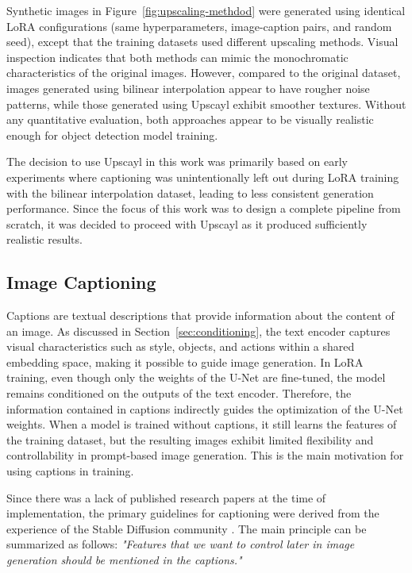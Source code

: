 Synthetic images in Figure~\ref{fig:upscaling-methdod} were generated using identical LoRA configurations (same hyperparameters, image-caption pairs, and random seed), except that the training datasets used different upscaling methods. Visual inspection indicates that both methods can mimic the monochromatic characteristics of the original images. However, compared to the original dataset, images generated using bilinear interpolation appear to have rougher noise patterns, while those generated using Upscayl exhibit smoother textures. Without any quantitative evaluation, both approaches appear to be visually realistic enough for object detection model training.

The decision to use Upscayl in this work was primarily based on early experiments where captioning was unintentionally left out during LoRA training with the bilinear interpolation dataset, leading to less consistent generation performance. Since the focus of this work was to design a complete pipeline from scratch, it was decided to proceed with Upscayl as it produced sufficiently realistic results.

\subsection{Image Captioning}
Captions are textual descriptions that provide information about the content of an image. As discussed in Section~\ref{sec:conditioning}, the text encoder captures visual characteristics such as style, objects, and actions within a shared embedding space, making it possible to guide image generation. In LoRA training, even though only the weights of the U-Net are fine-tuned, the model remains conditioned on the outputs of the text encoder. Therefore, the information contained in captions indirectly guides the optimization of the U-Net weights. When a model is trained without captions, it still learns the features of the training dataset, but the resulting images exhibit limited flexibility and controllability in prompt-based image generation. This is the main motivation for using captions in training.

Since there was a lack of published research papers at the time of implementation, the primary guidelines for captioning were derived from the experience of the Stable Diffusion community \cite{followfoxai_impact_style_training_2023, civitai_flux_lora_2024, reddit_lora_captioning_2024,reddit_no_captions_lora_2024,reddit_adv_model_training_2023}. The main principle can be summarized as follows: \textit{"Features that we want to control later in image generation should be mentioned in the captions."}

